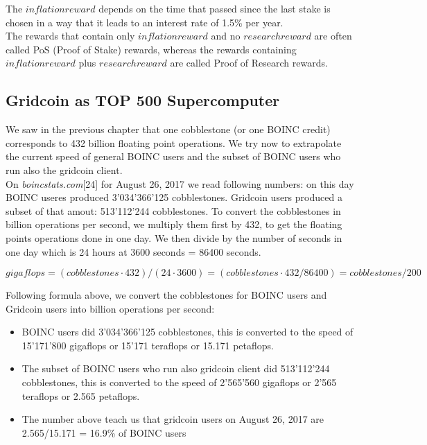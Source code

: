 The $inflationreward$ depends on the time that passed since the last stake is chosen in a way that it leads to an interest rate of 1.5\% per year.\\

The rewards that contain only $inflationreward$ and no $researchreward$
are often called PoS (Proof of Stake) rewards, whereas the rewards containing $inflationreward$ plus $researchreward$ are called Proof of Research rewards.


\subsection{Gridcoin as TOP 500 Supercomputer}

We saw in the previous chapter that one cobblestone (or one BOINC credit) corresponds to 432 billion floating point operations. We try now to extrapolate the current speed of general BOINC users and the subset of BOINC users who run also the gridcoin client.\\

On \textit{boincstats.com}[24] for August 26, 2017 we read following numbers: on this day BOINC useres produced 3'034'366'125 cobblestones. Gridcoin users produced a subset of that amout: 513'112'244 cobblestones. To convert the cobblestones in billion operations per second, we multiply them first by 432, to get the floating points operations done in one day. We then divide by the number of seconds in one day which is 24 hours at 3600 seconds = 86400 seconds.

\[ gigaflops = (cobblestones \cdot 432)/(24 \cdot 3600) = (cobblestones \cdot 432/86400) = cobblestones/200 \]

Following formula above, we convert the cobblestones for BOINC users and Gridcoin users into billion operations per second:

\begin{itemize}
	\item BOINC users did 3'034'366'125 cobblestones, this is converted to the speed of 15'171'800 gigaflops or 15'171 teraflops or 15.171 petaflops.
	\item The subset of BOINC users who run also gridcoin client did 513'112'244 cobblestones, this is converted to the speed of 2'565'560 gigaflops or 2'565 teraflops or 2.565 petaflops.
	\item The number above teach us that gridcoin users on August 26, 2017 are 2.565/15.171 = 16.9\% of BOINC users
\end{itemize}

